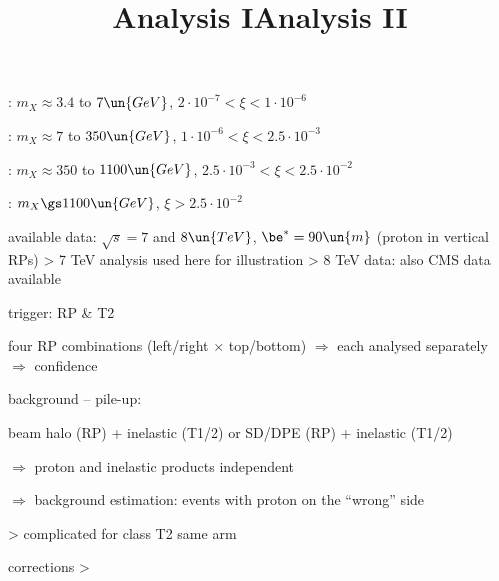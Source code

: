 \vskip-5mm

\> : $m_X \approx 3.4$ to $7\un{GeV}$, $2\cdot10^{-7} < \xi < 1\cdot 10^{-6}$


\> : $m_X \approx 7$ to $350\un{GeV}$, $1\cdot10^{-6} < \xi < 2.5\cdot 10^{-3}$


\> : $m_X \approx 350$ to $1100\un{GeV}$, $2.5\cdot10^{-3} < \xi < 2.5\cdot 10^{-2}$


\> : $m_X \gs 1100\un{GeV}$, $\xi > 2.5\cdot 10^{-2}$


\newpage %
\title{Analysis I}

\> available data: $\sqrt s = 7$ and $8\un{TeV}$, $\be^* = 90\un{m}$ (proton in vertical RPs)
\>> 7 TeV analysis used here for illustration
\>> 8 TeV data: also CMS data available

\> trigger: RP \& T2

\> four RP combinations (left/right $\times$ top/bottom) $\Rightarrow$ each analysed separately $\Rightarrow$ confidence

\> background -- pile-up:

\centerline{beam halo (RP) + inelastic (T1/2) \hskip10mm or \hskip10mm SD/DPE (RP) + inelastic (T1/2)}

$\Rightarrow$ proton and inelastic products independent

$\Rightarrow$ background estimation: events with proton on the ``wrong'' side

\vskip1mm
\vskip1mm

\>> complicated for class {T2 same arm}

\newpage %
\title{Analysis II}

\vskip-7mm

\> corrections
\>> 


